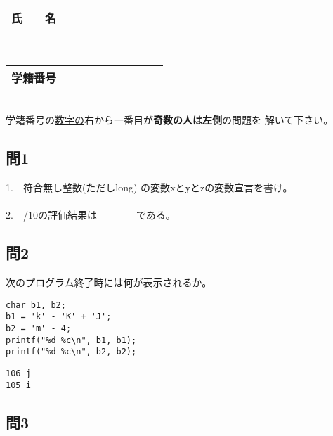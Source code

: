 \documentclass[a4j]{jarticle}
\def\ds{\displaystyle}
\begin{document}
\thispagestyle{empty}

\begin{multicols*}{2}%


\def\subst#1#2{$\ds #1$
 \ $\longrightarrow$\ 
 \underline{\hbox to 5cm{\ttfamily #2}}}



\noindent
\begin{tabular}[t]{|c|cccccccc|}\hline
氏　　名 & & & & & & & & \\ \hline
\end{tabular}\\
\begin{tabular}[t]{|c|c|c|c|c|c|c|c|c|c|}\hline
学籍番号 & & & & & & & & \\ \hline
\end{tabular}\\
学籍番号の\underline{数字の}右から一番目が{\bfseries 奇数の人は左側}の問題を
解いて下さい。
\vspace{-5ex}


\subsection*{問1}



1.　符合無し整数(ただしlong)
の変数{\ttfamily xとyとz}の変数宣言を書け。\\
\\


2.　{/10}の評価結果は　　　　である。





\subsection*{問2}

次のプログラム終了時には何が表示されるか。
\begin{verbatim}
char b1, b2;
b1 = 'k' - 'K' + 'J';
b2 = 'm' - 4;
printf("%d %c\n", b1, b1);
printf("%d %c\n", b2, b2);
\end{verbatim}

\ifnum {}
\vspace*{1.5cm}
\else
\begin{verbatim}
106 j
105 i
\end{verbatim}
\fi


\subsection*{問3}


\end{multicols*}
\end{document}

